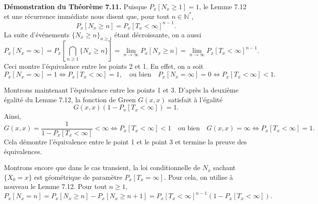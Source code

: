 \textbf{Démonstration du Théorème 7.11.} Puisque \(P_x[N_x \geq 1] = 1\), le Lemme 7.12 et une récurrence immédiate nous disent que, pour tout \(n \in \mathbb{N}^*\),
\[
P_x[N_x \geq n] = P_x[T_x < \infty]^{n-1}.
\]
La suite d'événements \(\{N_x \geq n\}_{n \geq 1}\) étant décroissante, on a aussi
\[
P_x[N_x = \infty] = P_x\left[\bigcap_{n \geq 1} \{N_x \geq n\}\right] = \lim_{n \to \infty} P_x[N_x \geq n] = \lim_{n \to \infty} P_x[T_x < \infty]^{n-1}.
\]
Ceci montre l'équivalence entre les points 2 et 1. En effet, on a soit
\[
P_x[N_x = \infty] = 1 \Leftrightarrow P_x[T_x < \infty] = 1, \quad \text{ou bien} \quad P_x[N_x = \infty] = 0 \Leftrightarrow P_x[T_x < \infty] < 1.
\]

Montrons maintenant l'équivalence entre les points 1 et 3. D'après la deuxième égalité du Lemme 7.12, la fonction de Green \(G(x, x)\) satisfait à l'égalité
\[
G(x, x)(1 - P_x[T_x < \infty]) = 1.
\]
Ainsi,
\[
G(x, x) = \frac{1}{1 - P_x[T_x < \infty]} < \infty \Leftrightarrow P_x[T_x < \infty] < 1 \quad \text{ou bien} \quad G(x, x) = \infty \Leftrightarrow P_x[T_x < \infty] = 1.
\]
Cela démontre l'équivalence entre le point 1 et le point 3 et termine la preuve des équivalences.

Montrons encore que dans le cas transient, la loi conditionnelle de \(N_x\) sachant \(\{X_0 = x\}\) est géométrique de paramètre \(P_x[T_x = \infty]\). Pour cela, on utilise à nouveau le Lemme 7.12. Pour tout \(n \geq 1\),
\[
P_x[N_x = n] = P_x[N_x \geq n] - P_x[N_x \geq n + 1] = P_x[T_x < \infty]^{n-1} (1 - P_x[T_x < \infty]).
\]
